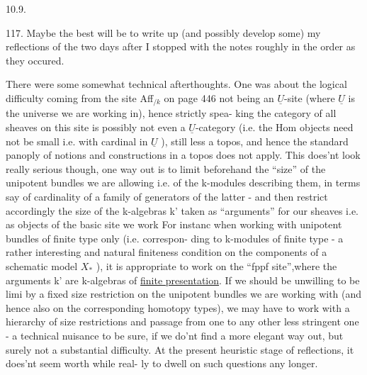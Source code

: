 
10.9.

117. Maybe the best will be to write up (and possibly develop some)
my reflections \hand{(}of the two days after I stopped with the
notes\hand{)} roughly in the order as they occured.

There were some somewhat technical afterthoughts. One was about the
logical difficulty coming from the site Aff$_{/k}$ on page 446 not being an
$\underline{U}$-site (where $\underline{U}$ is the universe we are working in), hence strictly spea-%
king the category of all sheaves on this site is possibly not even a
$\underline{U}$-category (i.e. the Hom objects need not be small i.e. with cardinal in
$\underline{U}$ ), still less a topos, and hence the standard panoply of notions and
constructions in a topos does not apply. This does'nt look really serious
though, one way out is to limit beforehand the ``size'' of the unipotent
bundles we are allowing i.e. of the k-modules describing them, in terms
say of cardinality of a family of generators of the latter - and then
restrict accordingly the size of the k-algebras k' taken as ``arguments''
for our sheaves i.e. as objects of the basic site we work For instanc
when working with unipotent bundles of finite type only (i.e. correspon-%
ding to k-modules of finite type - a rather interesting and natural
finiteness  condition on the components of a schematic model $X_{\ast}$ ),
it is appropriate to work on the ``fppf site'',where the arguments k' are
k-algebras of \uline{finite presentation}. If we should be unwilling to be limi
by a fixed size restriction on the unipotent bundles we are working with
(and hence also on the corresponding homotopy types), we may have to work
with a hierarchy of size restrictions and passage from one to any other
less stringent one - a technical nuisance to be sure, if we do'nt find
a more elegant way out, but surely not a substantial difficulty. At the
present heuristic stage of reflections, it does'nt seem worth while real-%
ly to dwell on such questions any longer.

